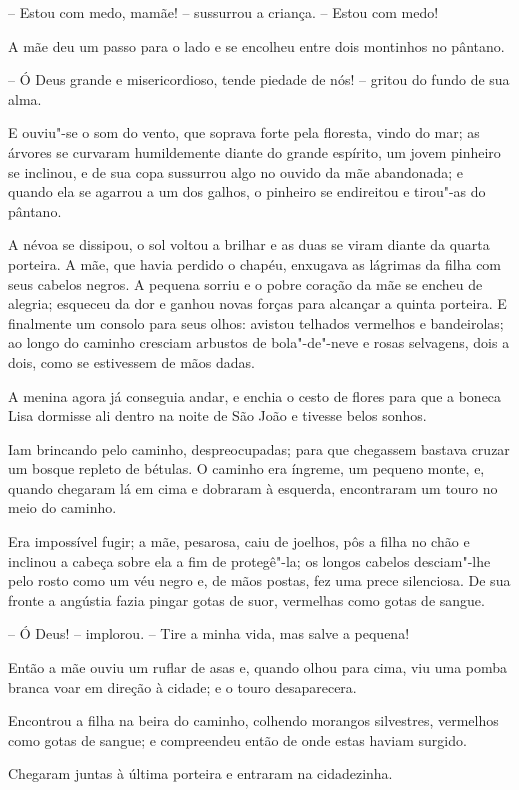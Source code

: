 -- Estou com medo, mamãe! -- sussurrou a criança. -- Estou com medo! 

A mãe deu um passo para o lado e se encolheu entre dois montinhos no
pântano.

-- Ó Deus grande e misericordioso, tende piedade de nós! -- gritou do
fundo de sua alma.

E ouviu"-se o som do vento, que soprava forte pela floresta, vindo do
mar; as árvores se curvaram humildemente diante do grande espírito, um
jovem pinheiro se inclinou, e de sua copa sussurrou algo no ouvido da
mãe abandonada; e quando ela se agarrou a um dos galhos, o pinheiro se
endireitou e tirou"-as do pântano.

A névoa se dissipou, o sol voltou a brilhar e as duas se viram diante da
quarta porteira. A mãe, que havia perdido o chapéu, enxugava as
lágrimas da filha com seus cabelos negros. A pequena sorriu e o pobre
coração da mãe se encheu de alegria; esqueceu da dor e ganhou novas
forças para alcançar a quinta porteira. E finalmente um consolo para
seus olhos: avistou telhados vermelhos e bandeirolas; ao longo do
caminho cresciam arbustos de bola"-de"-neve e rosas selvagens, dois a
dois, como se estivessem de mãos dadas. 

A menina agora já conseguia andar, e enchia o cesto de flores para que a
boneca Lisa dormisse ali dentro na noite de São João e tivesse belos
sonhos.

Iam brincando pelo caminho, despreocupadas; para que chegassem bastava
cruzar um bosque repleto de bétulas. O caminho era íngreme, um pequeno
monte, e, quando chegaram lá em cima e dobraram à esquerda, encontraram
um touro no meio do caminho.

Era impossível fugir; a mãe, pesarosa, caiu de joelhos, pôs a filha no
chão e inclinou a cabeça sobre ela a fim de protegê"-la; os longos
cabelos desciam"-lhe pelo rosto como um véu negro e, de mãos postas,
fez uma prece silenciosa. De sua fronte a angústia fazia pingar gotas
de suor, vermelhas como gotas de sangue.

-- Ó Deus! -- implorou. -- Tire a minha vida, mas salve a pequena!

Então a mãe ouviu um ruflar de asas e, quando olhou para cima, viu uma
pomba branca voar em direção à cidade; e o touro desaparecera.

Encontrou a filha na beira do caminho, colhendo morangos silvestres,
vermelhos como gotas de sangue; e compreendeu então de onde estas haviam surgido.

Chegaram juntas à última porteira e entraram na cidadezinha.

